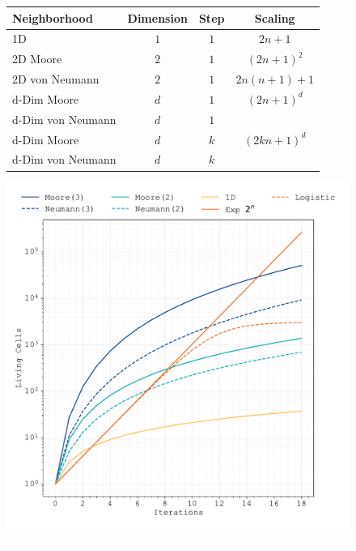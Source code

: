 \documentclass{article}
\newcommand{\todo}[1]{\colorbox{WildStrawberry}{\textcolor{white}{#1}}}
\begin{document}
\begin{figure}[h]
    \begin{minipage}{0.5\textwidth}
        \centering
        \begin{tabular}{lccc}
            Neighborhood & Dimension & Step & Scaling\\
            \midrule
            1D                  & $1$ & $1$ & $2n+1$\\
            2D Moore            & $2$ & $1$ & $(2n+1)^2$\\
            2D von Neumann      & $2$ & $1$ & $2n(n+1)+1$\\
            d-Dim Moore         & $d$ & $1$ & $(2n+1)^d$\\
            d-Dim von Neumann   & $d$ & $1$ & \todo{calculate it}\\
            d-Dim Moore  & $d$ & $k$ & $(2kn+1)^d$\\
            d-Dim von Neumann & $d$ & $k$ & \todo{calculate it}
        \end{tabular}
    \end{minipage}%
    \hspace{0.05\textwidth}%
    \begin{minipage}{0.44\textwidth}
        \includegraphics[width=\textwidth]{ca-rules/ca-scaling.pdf}
    \end{minipage}
    \caption{\todo{insert new image of various scalings; caption for image}}
    \label{fig:ca-scaling}
\end{figure}
\end{document}
